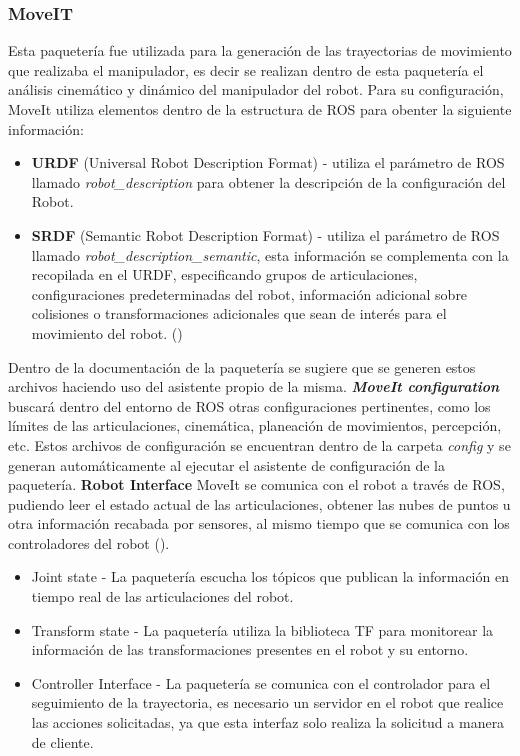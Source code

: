             \subsubsection{MoveIT}
            Esta paquetería fue utilizada para la generación de las trayectorias de movimiento que realizaba el manipulador, es decir se realizan dentro de esta paquetería el análisis cinemático y dinámico del manipulador del robot. Para su configuración, MoveIt utiliza elementos dentro de la estructura de ROS para obenter la siguiente información: 
            \begin{itemize}
                \item \textbf{URDF} (Universal Robot Description Format) - utiliza el parámetro de ROS llamado \textit{robot\_description} para obtener la descripción de la configuración del Robot. 
                \item \textbf{SRDF} (Semantic Robot Description Format) - utiliza el parámetro de ROS llamado \textit{robot\_description\_semantic}, esta información se complementa con la recopilada en el URDF, especificando grupos de articulaciones, configuraciones predeterminadas del robot, información adicional sobre colisiones o transformaciones adicionales que sean de interés para el movimiento del robot. (\cite{ROS_concepts_MoveIt}) 
            \end{itemize}                
                Dentro de la documentación de la paquetería se sugiere que se generen estos archivos haciendo uso del asistente propio de la misma. \textbf{\textit{MoveIt configuration}} buscará dentro del entorno de ROS otras configuraciones pertinentes, como los límites de las articulaciones, cinemática, planeación de movimientos, percepción, etc. Estos archivos de configuración se encuentran dentro de la carpeta \textit{config} y se generan automáticamente al ejecutar el asistente de configuración de la paquetería.
            \textbf{Robot Interface}
             MoveIt se comunica con el robot a través de ROS, pudiendo leer el estado actual de las articulaciones, obtener las nubes de puntos u otra información recabada por sensores, al mismo tiempo que se comunica con los controladores del robot (\cite{ROS_concepts_MoveIt}).
             \begin{itemize}
                 \item Joint state - La paquetería escucha los tópicos que publican la información en tiempo real de las articulaciones del robot.
                 \item Transform state - La paquetería utiliza la biblioteca TF para monitorear la información de las transformaciones presentes en el robot y su entorno.
                 \item Controller Interface - La paquetería se comunica con el controlador para el seguimiento de la trayectoria, es necesario un servidor en el robot que realice las acciones solicitadas, ya que esta interfaz solo realiza la solicitud a manera de cliente.
             \end{itemize}
             

